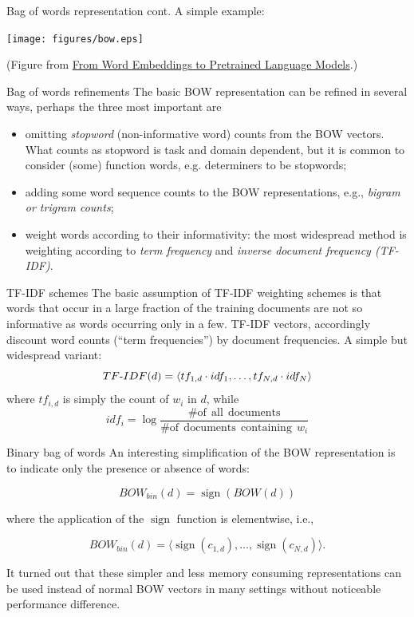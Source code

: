 \documentclass[style=upen, size=14pt]{powerdot}
\DeclareMathOperator{\sign}{sign}
\newcommand{\gold}{\color{arany}}
\theoremstyle{definition}
\begin{document}
 
 \begin{slide}[toc=]{Bag of words representation cont.}
   A simple example:\smallskip
   
   \texttt{[image: figures/bow.eps]}

   \begin{center}
     \footnotesize{(Figure from \href{https://towardsdatascience.com/from-word-embeddings-to-pretrained-language-models-a-new-age-in-nlp-part-1-7ed0c7f3dfc5}{From Word Embeddings to Pretrained Language Models}.)}     
   \end{center}
 \end{slide}

 \begin{slide}[toc=]{Bag of words refinements}
   The basic BOW representation can be refined in several ways, perhaps the
   three most important are
   \begin{itemize}
   \item omitting \emph{\gold stopword} (non-informative word) counts from the
     BOW vectors. What counts as stopword is task and domain dependent, but it
     is common to consider (some) function words, e.g. determiners to be
     stopwords;
   \item adding some word sequence counts to the BOW representations, e.g.,
     \emph{\gold bigram or trigram counts};
   \item weight words according to their informativity: the most widespread
     method is weighting according to \emph{\gold term frequency} and
     \emph{\gold inverse document frequency (TF-IDF)}.
   \end{itemize}
 \end{slide}


 \begin{slide}[toc=TF-IDF]{TF-IDF schemes}
   The basic assumption of TF-IDF weighting schemes is that words that occur in
   a large fraction of the training documents are not so informative as words
   occurring only in a few. TF-IDF vectors, accordingly discount word counts
   (``term frequencies'') by document frequencies. A simple but widespread
   variant:
   $$TF{\text -}IDF(d)=\langle tf_{1,d}\cdot idf_1, \dots, tf_{N,d}\cdot idf_N\rangle$$
   where $tf_{i,d}$ is simply the count of $w_i$ in $d$, while
   $$
   idf_i = \log\frac{\mathrm{\# of~~all~~documents}}{\mathrm{\# of~~documents~~containing}~~w_i  }
   $$
 \end{slide}

 \begin{slide}[toc=]{Binary bag of words}
   An interesting simplification of the BOW representation is to indicate only
   the presence or absence of words:

   $$BOW_{bin}(d)=\sign(BOW(d))$$

   where the application of the $\sign$ function is elementwise, i.e.,

   $$BOW_{bin}(d)=\langle \sign(c_{1,d}), \dots, \sign(c_{N,d})\rangle.$$
   
   It turned out that these simpler and less memory consuming representations
   can be used instead of normal BOW vectors in many settings without noticeable
   performance difference.
 \end{slide}
\end{document}
